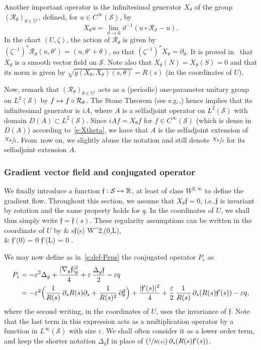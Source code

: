 \documentclass[11pt]{article}
\newcommand{\ie}{i.e.,\xspace}
\newcommand{\eg}{e.g.,\xspace}
\numberwithin{equation}{section}
\newcommand\mto{\mathchoice{\longmapsto}{\mapsto}{\mapsto}{\mapsto}}
\newcommand{\Psfrac}[2]{(\sfrac{#1}{#2})}
\theoremstyle{definition}
\newcommand{\calR}{\ensuremath{\mathcal R}}
\newcommand{\calS}{\ensuremath{\mathcal S}}
\newcommand{\mb}[1]{\ensuremath{\mathbb{#1}}}
\newcommand{\R}{{\mb{R}}}
\newcommand{\bS}{\ensuremath{\mathbb S}}
\newcommand{\f}{\ensuremath{\mathfrak{f}}}
\def\baln#1\naln{\begin{align}#1\end{align}}
\newcommand\Lap{\Delta_{g}}
\newcommand\nablag{\nabla_{g}}
\let\d\partial
\let\eps\varepsilon
\let\q q
\begin{document}
Another important operator is the infinitesimal generator $X_\theta$ of the group $(\calR_\theta)_{\theta \in \bS^1}$, defined, for $u \in C^\infty(\calS)$, by
\begin{equation}
\label{e:Xtheta}
X_\theta u = \lim_{\vartheta \to 0} \vartheta^{-1} (u \circ \calR_\vartheta -u).
\end{equation}
In the chart $(U, \zeta)$, the action of $\calR_\theta$ is given by $(\zeta^{-1})^* \calR_\theta (u, \theta') = (u, \theta' +\theta)$, so that $(\zeta^{-1})^* X_\theta = \d_\theta$.
It is proved in~\cite[\S 3.2]{LL:18} that $X_\theta$ is a smooth vector field on $\calS$.
Note also that $X_\theta(N) = X_\theta(S)=0$ and that its norm is given by $\sqrt{g(X_\theta, X_\theta) (s, \theta)}= R(s)$ (in the coordinates of $U$).

Now, remark that $(\calR_\theta)_{\theta \in \bS^1}$ acts as a (periodic) one-parameter unitary group on $L^2(\calS)$ by $f \mto f\circ \calR_\theta$. The Stone Theorem (see \eg \cite[Th.\,VIII-8, p.\,266]{RS:I}) hence implies that its infinitesimal generator is $i A$, where $A$ is a selfadjoint operator on $L^2(\calS)$ with domain $D(A) \subset L^2(\calS)$. Since $i Af = X_\theta f$ for $f \in C^\infty(\calS)$ (which is dense in $D(A)$) according to~\eqref{e:Xtheta}, we have that $A$ is the selfadjoint extension of $\sfrac{X_\theta}{i}$. From~now on, we slightly abuse the notation and still denote $\sfrac{X_\theta}{i}$ for its selfadjoint extension $A$.

\subsubsection*{Gradient vector field and conjugated operator}
We finally introduce a function $\f : \calS \mto \R$, at least of class $W^{2,\infty}$ to define the gradient flow. Throughout this section, we assume that $X_\theta \f = 0$, \ie $\f$ is invariant by rotation and the same property holds for $q$. In the coordinates of $U$, we shall thus simply write $\f=\f(s)$. These regularity assumptions can be written in the coordinate of $U$ by
\baln
\label{e:reg-f}
& s\mto \f(s) \in W^{2,\infty}(0,L),  \nonumber\\
& \f'(0) = 0  \quad
{} \f'(L) = 0 .
\naln

We may now define as in~\eqref{e:def-Peps} the conjugated operator $P_\eps$ as
\begin{align}
\label{e:defPeps}
P_\eps & = - \eps^2 \Lap + \frac{|\nablag \f|_g^2}{4} + \eps\, \frac{\Lap \f}{2} -\eps \q\nonumber \\
& = - \eps^2 \Bigl( \frac{1}{R(s)}\, \d_s R(s) \d_s + \frac{1}{R(s)^2}\, \d_\theta^2 \Bigr) + \frac{|\f'(s)|^2}{4} + \frac{\eps}{2}\, \frac{1}{R(s)}\, \d_s (R(s)\f'(s)) -\eps \q,
\end{align}
where the second writing, in the coordinates of $U$, uses the invariance of $\f$. Note that the last term in this expression acts as a multiplication operator by a function in $L^\infty(\calS)$ with size $\eps$. We shall often consider it as a lower order term, and keep the shorter notation $\Lap \f$ in place of $\Psfrac{1}{R(s)}\, \d_s (R(s)\f'(s))$.
\end{document}
